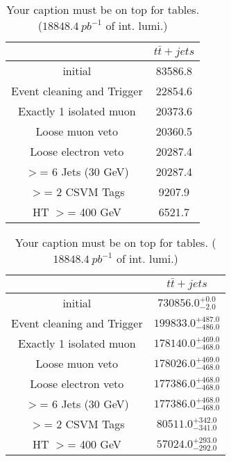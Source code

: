 \documentclass{article}
\begin{document}
\begin{table}
\caption{Your caption must be on top for tables. ($18848.4~pb^{-1}$ of int. lumi.)}
\label{tab:}
\centering
\begin{tabular}{|c|c|}
\toprule
&$t\bar{t}+jets$	\\

\midrule
initial&	83586.8	\\

Event cleaning and Trigger&	22854.6	\\

Exactly 1 isolated muon&	20373.6	\\

Loose muon veto&	20360.5	\\

Loose electron veto&	20287.4	\\

$>$= 6 Jets (30 GeV)&	20287.4	\\

$>$= 2 CSVM Tags&	9207.9	\\

HT $>$=  400 GeV&	6521.7	\\

\bottomrule
\end{tabular}
\end{table}
\begin{table}
\caption{Your caption must be on top for tables. ($18848.4~pb^{-1}$ of int. lumi.)}
\label{tab:}
\centering
\begin{tabular}{|c|c|}
\toprule
&$t\bar{t}+jets$	\\

\midrule
initial&	$730856.0^{+0.0}_{-2.0}$	\\

Event cleaning and Trigger&	$199833.0^{+487.0}_{-486.0}$	\\

Exactly 1 isolated muon&	$178140.0^{+469.0}_{-468.0}$	\\

Loose muon veto&	$178026.0^{+469.0}_{-468.0}$	\\

Loose electron veto&	$177386.0^{+468.0}_{-468.0}$	\\

$>$= 6 Jets (30 GeV)&	$177386.0^{+468.0}_{-468.0}$	\\

$>$= 2 CSVM Tags&	$80511.0^{+342.0}_{-341.0}$	\\

HT $>$=  400 GeV&	$57024.0^{+293.0}_{-292.0}$	\\

\bottomrule
\end{tabular}
\end{table}
\end{document}
